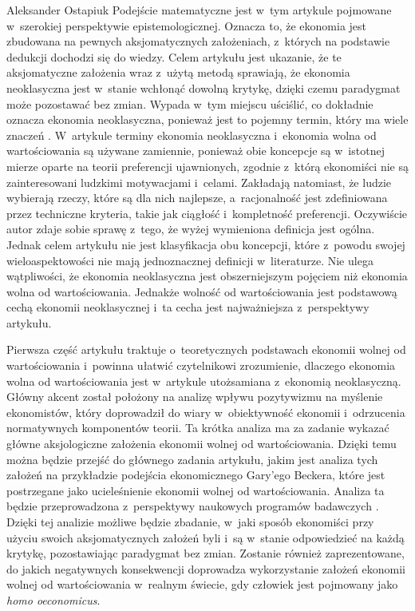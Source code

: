 \begin{artplenv}{Aleksander Ostapiuk}
Podejście matematyczne jest w~tym artykule pojmowane w~szerokiej perspektywie epistemologicznej. Oznacza to, że ekonomia
jest zbudowana na pewnych aksjomatycznych założeniach, z~których na podstawie dedukcji dochodzi się do wiedzy. Celem
artykułu jest ukazanie, że te aksjomatyczne założenia wraz z~użytą metodą sprawiają, że ekonomia neoklasyczna
jest w~stanie wchłonąć dowolną krytykę, dzięki czemu paradygmat może pozostawać bez zmian. Wypada w~tym miejscu
uściślić, co dokładnie oznacza ekonomia neoklasyczna, ponieważ jest to pojemny termin, który ma wiele znaczeń
\parencite{colander_death_2000}.
W~artykule terminy ekonomia neoklasyczna i~ekonomia wolna od wartościowania
są używane zamiennie, ponieważ obie koncepcje są w~istotnej mierze oparte na teorii preferencji ujawnionych, zgodnie z~którą
ekonomiści nie są zainteresowani ludzkimi motywacjami i~celami. Zakładają natomiast, że ludzie wybierają rzeczy, które
są dla nich najlepsze, a~racjonalność jest zdefiniowana przez techniczne kryteria, takie jak ciągłość i~kompletność
preferencji. Oczywiście autor zdaje sobie sprawę z~tego, że wyżej wymieniona definicja jest ogólna. Jednak celem
artykułu nie jest klasyfikacja obu koncepcji, które z~powodu swojej wieloaspektowości nie mają jednoznacznej
definicji w~literaturze. Nie ulega wątpliwości, że ekonomia neoklasyczna jest obszerniejszym pojęciem niż ekonomia wolna od
wartościowania. Jednakże wolność od wartościowania jest podstawową cechą ekonomii neoklasycznej
\parencite{sen_rational_1977,putnam_end_2011,hausman_etyka_2017_ost}
i~ta cecha jest
najważniejsza z~perspektywy artykułu. 

Pierwsza część artykułu traktuje o~teoretycznych podstawach ekonomii wolnej od wartościowania i~powinna ułatwić
czytelnikowi zrozumienie, dlaczego ekonomia wolna od wartościowania jest w~artykule utożsamiana z~ekonomią
neoklasyczną. Główny akcent został położony na analizę wpływu pozytywizmu na myślenie ekonomistów, który doprowadził do
wiary w~obiektywność ekonomii i~odrzucenia normatywnych komponentów teorii. Ta krótka analiza ma za zadanie wykazać
główne aksjologiczne założenia ekonomii wolnej od wartościowania. Dzięki temu można będzie przejść do głównego zadania
artykułu, jakim jest analiza tych założeń na przykładzie podejścia ekonomicznego Gary'ego Beckera, które jest
postrzegane jako ucieleśnienie ekonomii wolnej od wartościowania. Analiza ta będzie
przeprowadzona z~perspektywy naukowych programów badawczych
\parencite{lakatos_methodology_1980,lakatos_pisma_1995}.
Dzięki tej analizie możliwe
będzie zbadanie, w~jaki sposób ekonomiści przy użyciu swoich aksjomatycznych założeń byli i~są w~stanie odpowiedzieć na
każdą krytykę, pozostawiając paradygmat bez zmian. Zostanie również zaprezentowane, do jakich negatywnych konsekwencji
doprowadza wykorzystanie założeń ekonomii wolnej od wartościowania w~realnym świecie, gdy człowiek jest pojmowany
jako \textit{homo oeconomicus}.


\end{artplenv}

